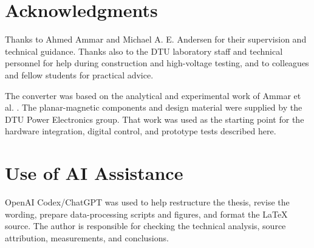 \section*{Acknowledgments}

Thanks to Ahmed Ammar and Michael A. E. Andersen for their supervision and technical guidance. Thanks also to the DTU laboratory staff and technical personnel for help during construction and high-voltage testing, and to colleagues and fellow students for practical advice.

The converter was based on the analytical and experimental work of Ammar et al. \cite{ammar2020chargepump,ammar2021led}. The planar-magnetic components and design material were supplied by the DTU Power Electronics group. That work was used as the starting point for the hardware integration, digital control, and prototype tests described here.

\section*{Use of AI Assistance}

OpenAI Codex/ChatGPT was used to help restructure the thesis, revise the wording, prepare data-processing scripts and figures, and format the LaTeX source. The author is responsible for checking the technical analysis, source attribution, measurements, and conclusions.

\vspace{1em}
\hfill \thesisauthor
